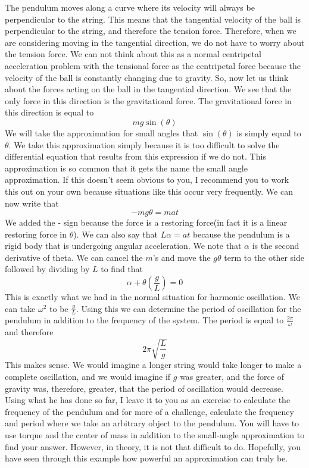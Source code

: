 The pendulum moves along a curve where its velocity will always be perpendicular to the string. This means that the tangential velocity of the ball is perpendicular to the string, and therefore the tension force. Therefore, when we are considering moving in the tangential direction, we do not have to worry about the tension force. We can not think about this as a normal centripetal acceleration problem with the tensional force as the centripetal force because the velocity of the ball is constantly changing due to gravity. So, now let us think about the forces acting on the ball in the tangential direction. We see that the only force in this direction is the gravitational force. The gravitational force in this direction is equal to $$mg\sin\left(\theta \right)$$ We will take the approximation for small angles that $\sin\left(\theta \right)$ is simply equal to $\theta$. We take this approximation simply because it is too difficult to solve the differential equation that results from this expression if we do not. This approximation is so common that it gets the name the small angle approximation. If this doesn't seem obvious to you, I recommend you to work this out on your own because situations like this occur very frequently. We can now write that $$-mg\theta=mat$$ We added the - sign because the force is a restoring force(in fact it is a linear restoring force in $\theta$). We can also say that $L\alpha=at$ because the pendulum is a rigid body that is undergoing angular acceleration. We note that $\alpha$ is the second derivative of theta. We can cancel the $m$’s and move the $g\theta$ term to the other side followed by dividing by $L$ to find that \begin{equation}\alpha+\theta \left(\frac{g}{L}\right) =0\end{equation} This is exactly what we had in the normal situation for harmonic oscillation. We can take $\omega^2$ to be $\frac{g}{L}$. Using this we can determine the period of oscillation for the pendulum in addition to the frequency of the system. The period is equal to $\frac{2\pi}{\omega}$ and therefore $$2\pi \sqrt{\frac{L}{g}}$$ This makes sense. We would imagine a longer string would take longer to make a complete oscillation, and we would imagine if $g$ was greater, and the force of gravity was, therefore, greater, that the period of oscillation would decrease. Using what he has done so far, I leave it to you as an exercise to calculate the frequency of the pendulum and for more of a challenge, calculate the frequency and period where we take an arbitrary object to the pendulum. You will have to use torque and the center of mass in addition to the small-angle approximation to find your answer. However, in theory, it is not that difficult to do. Hopefully, you have seen through this example how powerful an approximation can truly be. 
\pagebreak
